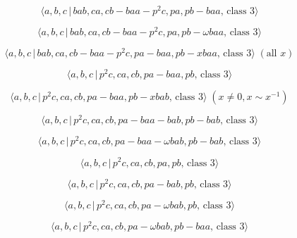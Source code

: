 \documentclass[10pt]{article}
\begin{document}
\begin{equation}
\langle a,b,c\,|\,bab,ca,cb-baa-p^2c,pa,pb-baa,\,\text{class }3\rangle 
\tag{7.702}
\end{equation}

\begin{equation}
\langle a,b,c\,|\,bab,ca,cb-baa-p^{2}c,pa,pb-\omega baa,\,\text{class }%
3\rangle  \tag{7.703}
\end{equation}

\begin{equation}
\langle a,b,c\,|\,bab,ca,cb-baa-p^2c,pa-baa,pb-xbaa,\,\text{class }3\rangle
\;(\text{all }x)  \tag{7.704}
\end{equation}

\begin{equation}
\langle a,b,c\,|\,p^2c,ca,cb,pa-baa,pb,\,\text{class }3\rangle  \tag{7.705}
\end{equation}

\begin{equation}
\langle a,b,c\,|\,p^2c,ca,cb,pa-baa,pb-xbab,\,\text{class }3\rangle \;(x
\neq 0, x \sim x^{-1})  \tag{7.706}
\end{equation}

\begin{equation}
\langle a,b,c\,|\,p^2c,ca,cb,pa-baa-bab,pb-bab,\,\text{class }3\rangle 
\tag{7.707}
\end{equation}

\begin{equation}
\langle a,b,c\,|\,p^{2}c,ca,cb,pa-baa-\omega bab,pb-bab,\,\text{class }%
3\rangle  \tag{7.708}
\end{equation}

\begin{equation}
\langle a,b,c\,|\,p^2c,ca,cb,pa,pb,\,\text{class }3\rangle  \tag{7.709}
\end{equation}

\begin{equation}
\langle a,b,c\,|\,p^2c,ca,cb,pa-bab,pb,\,\text{class }3\rangle  \tag{7.710}
\end{equation}

\begin{equation}
\langle a,b,c\,|\,p^{2}c,ca,cb,pa-\omega bab,pb,\,\text{class }3\rangle 
\tag{7.711}
\end{equation}

\begin{equation}
\langle a,b,c\,|\,p^{2}c,ca,cb,pa-\omega bab,pb-baa,\,\text{class }3\rangle 
\tag{7.712}
\end{equation}
\end{document}
